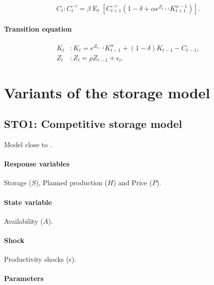 \documentclass[11pt,fleqn]{article}
\DeclareMathOperator{\E}{E}
\begin{document}
\begin{equation}
  C_{t}: C_{t}^{-\tau}=\beta\E_{t}\left[C_{t+1}^{-\tau}\left(1-\delta+\alpha e^{Z_{t+1}}K_{t+1}^{\alpha-1}\right)\right].
\end{equation}

\paragraph{Transition equation}

\begin{align}
  K_{t}&: K_{t}=e^{Z_{t-1}}K_{t-1}^{\alpha}+\left(1-\delta\right)K_{t-1}-C_{t-1},\\
  Z_{t}&: Z_{t}=\rho Z_{t-1}+\epsilon_{t}.
\end{align}

\section{Variants of the storage model}
\label{sec:vari-stor-model}

\subsection{STO1: Competitive storage model}
\label{sec:comp-stor-model}

Model close to \citet{Wrig82}.

\paragraph{Response variables}
\label{sec:response-variables}

Storage ($S$), Planned production ($H$) and Price ($P$).

\paragraph{State variable}
\label{sec:state-variable}

Availability ($A$).

\paragraph{Shock}

Productivity shocks ($\epsilon$).

\paragraph{Parameters}
\end{document}

